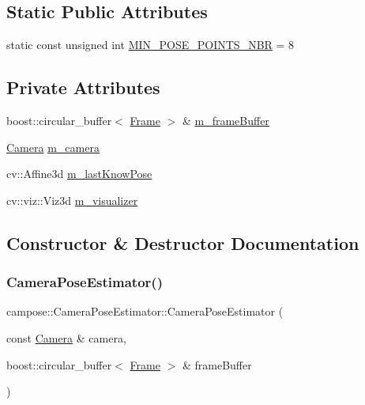 \subsection*{Static Public Attributes}
\begin{DoxyCompactItemize}
\item 
static const unsigned int \hyperlink{classcampose_1_1CameraPoseEstimator_ab9495b3f0c0be7276c853bfb97a40f3e}{M\+I\+N\+\_\+\+P\+O\+S\+E\+\_\+\+P\+O\+I\+N\+T\+S\+\_\+\+N\+BR} = 8
\end{DoxyCompactItemize}
\subsection*{Private Attributes}
\begin{DoxyCompactItemize}
\item 
boost\+::circular\+\_\+buffer$<$ \hyperlink{classFrame}{Frame} $>$ \& \hyperlink{classcampose_1_1CameraPoseEstimator_a0e0b0b1b2c9f2c4bbfbc7260021ae723}{m\+\_\+frame\+Buffer}
\item 
\hyperlink{classCamera}{Camera} \hyperlink{classcampose_1_1CameraPoseEstimator_a57173dd1d143e7ac26a039c078204bef}{m\+\_\+camera}
\item 
cv\+::\+Affine3d \hyperlink{classcampose_1_1CameraPoseEstimator_a6afdbcffb70bbe52d945045e1c85fc7d}{m\+\_\+last\+Know\+Pose}
\item 
cv\+::viz\+::\+Viz3d \hyperlink{classcampose_1_1CameraPoseEstimator_a36fa39fcb86bb8758846d1dd0aaa14e9}{m\+\_\+visualizer}
\end{DoxyCompactItemize}


\subsection{Constructor \& Destructor Documentation}
\mbox{\label{classcampose_1_1CameraPoseEstimator_ac2e15d64ea58fbb2fe08b575a599a280}} 
\subsubsection{\texorpdfstring{Camera\+Pose\+Estimator()}{CameraPoseEstimator()}}
{\footnotesize\ttfamily campose\+::\+Camera\+Pose\+Estimator\+::\+Camera\+Pose\+Estimator (\begin{DoxyParamCaption}\item[{const \hyperlink{classCamera}{Camera} \&}]{camera,  }\item[{boost\+::circular\+\_\+buffer$<$ \hyperlink{classFrame}{Frame} $>$ \&}]{frame\+Buffer }\end{DoxyParamCaption})\hspace{0.3cm}{\ttfamily [inline]}}

